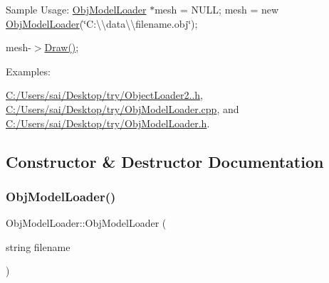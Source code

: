 Sample Usage\+: \mbox{\hyperlink{class_obj_model_loader}{Obj\+Model\+Loader}} $\ast$mesh = N\+U\+LL; mesh = new \mbox{\hyperlink{class_obj_model_loader}{Obj\+Model\+Loader}}(\char`\"{}\+C\+:\textbackslash{}\textbackslash{}data\textbackslash{}\textbackslash{}filename.\+obj\char`\"{});

mesh-\/$>$\mbox{\hyperlink{class_obj_model_loader_a65fe8c583425b7c77577ababd9073d37}{Draw()}}; \begin{Desc}
\item[Examples\+: ]\par
\mbox{\hyperlink{_c_1_2_users_2sai_2_desktop_2try_2_object_loader2_88_8h-example}{C\+:/\+Users/sai/\+Desktop/try/\+Object\+Loader2..\+h}}, \mbox{\hyperlink{_c_1_2_users_2sai_2_desktop_2try_2_obj_model_loader_8cpp-example}{C\+:/\+Users/sai/\+Desktop/try/\+Obj\+Model\+Loader.\+cpp}}, and \mbox{\hyperlink{_c_1_2_users_2sai_2_desktop_2try_2_obj_model_loader_8h-example}{C\+:/\+Users/sai/\+Desktop/try/\+Obj\+Model\+Loader.\+h}}.\end{Desc}


\subsection{Constructor \& Destructor Documentation}
\mbox{\label{class_obj_model_loader_afcdb98fbbeba6fa0551b772ca959347d}} 
\subsubsection{\texorpdfstring{Obj\+Model\+Loader()}{ObjModelLoader()}\hspace{0.1cm}{\footnotesize\ttfamily [1/3]}}
{\footnotesize\ttfamily Obj\+Model\+Loader\+::\+Obj\+Model\+Loader (\begin{DoxyParamCaption}\item[{string}]{filename }\end{DoxyParamCaption})}


